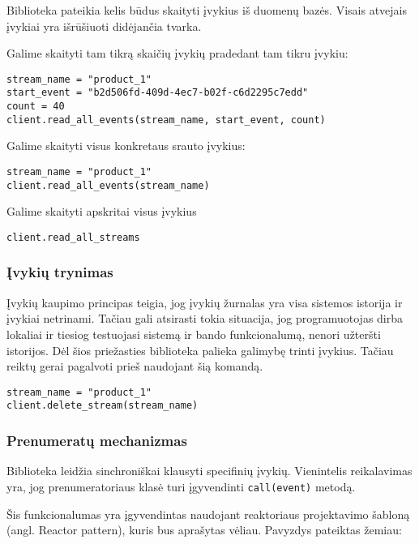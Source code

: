 Biblioteka pateikia kelis būdus skaityti įvykius iš duomenų bazės. Visais atvejais įvykiai yra išrūšiuoti didėjančia tvarka.

Galime skaityti tam tikrą skaičių įvykių pradedant tam tikru įvykiu:

\begin{lstlisting}[]
stream_name = "product_1" 
start_event = "b2d506fd-409d-4ec7-b02f-c6d2295c7edd"
count = 40
client.read_all_events(stream_name, start_event, count)
\end{lstlisting}

Galime skaityti visus konkretaus srauto įvykius:

\begin{lstlisting}[]
stream_name = "product_1" 
client.read_all_events(stream_name)
\end{lstlisting}

Galime skaityti apskritai visus įvykius

\begin{lstlisting}[]
client.read_all_streams
\end{lstlisting}

\subsubsection{Įvykių trynimas}

Įvykių kaupimo principas teigia, jog įvykių žurnalas yra visa sistemos istorija ir įvykiai netrinami. Tačiau gali atsirasti tokia situacija, jog programuotojas dirba lokaliai ir tiesiog testuojasi sistemą ir bando funkcionalumą, nenori užteršti istorijos. Dėl šios priežasties biblioteka palieka galimybę trinti įvykius. Tačiau reiktų gerai pagalvoti prieš naudojant šią komandą.

\begin{lstlisting}
stream_name = "product_1"
client.delete_stream(stream_name)
\end{lstlisting}

\subsubsection{Prenumeratų mechanizmas}

Biblioteka leidžia sinchroniškai klausyti specifinių įvykių. Vienintelis reikalavimas yra, jog prenumeratoriaus klasė turi įgyvendinti \lstinline|call(event)| metodą.

Šis funkcionalumas yra įgyvendintas naudojant reaktoriaus projektavimo šabloną (angl. Reactor pattern), kuris bus aprašytas vėliau. Pavyzdys pateiktas žemiau:

